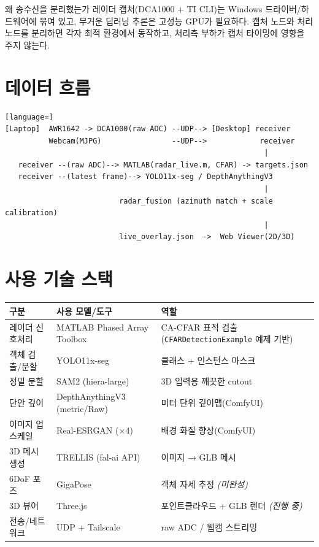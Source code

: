\begin{designbox}{왜 송수신을 분리했는가}
레이더 캡처(DCA1000 + TI CLI)는 Windows 드라이버/하드웨어에 묶여 있고, 무거운
딥러닝 추론은 고성능 GPU가 필요하다. 캡처 노드와 처리 노드를 분리하면 각자
최적 환경에서 동작하고, 처리측 부하가 캡처 타이밍에 영향을 주지 않는다.
\end{designbox}

\section{데이터 흐름}
\begin{lstlisting}[language=]
[Laptop]  AWR1642 -> DCA1000(raw ADC) --UDP--> [Desktop] receiver
          Webcam(MJPG)                --UDP-->            receiver
                                                           |
   receiver --(raw ADC)--> MATLAB(radar_live.m, CFAR) -> targets.json
   receiver --(latest frame)--> YOLO11x-seg / DepthAnythingV3
                                                           |
                          radar_fusion (azimuth match + scale calibration)
                                                           |
                          live_overlay.json  ->  Web Viewer(2D/3D)
\end{lstlisting}

\section{사용 기술 스택}
\begin{center}
\begin{tabular}{@{}llp{6.2cm}@{}}
\toprule
구분 & 사용 모델/도구 & 역할 \\
\midrule
레이더 신호처리 & MATLAB Phased Array Toolbox & CA-CFAR 표적 검출
  (\texttt{CFARDetectionExample} 예제 기반) \\
객체 검출/분할 & YOLO11x-seg & 클래스 + 인스턴스 마스크 \\
정밀 분할 & SAM2 (hiera-large) & 3D 입력용 깨끗한 cutout \\
단안 깊이 & DepthAnythingV3 (metric/Raw) & 미터 단위 깊이맵(ComfyUI) \\
이미지 업스케일 & Real-ESRGAN ($\times4$) & 배경 화질 향상(ComfyUI) \\
3D 메시 생성 & TRELLIS (fal-ai API) & 이미지 → GLB 메시 \\
6DoF 포즈 & GigaPose & 객체 자세 추정 \emph{(미완성)} \\
3D 뷰어 & Three.js & 포인트클라우드 + GLB 렌더 \emph{(진행 중)} \\
전송/네트워크 & UDP + Tailscale & raw ADC / 웹캠 스트리밍 \\
\bottomrule
\end{tabular}
\end{center}

